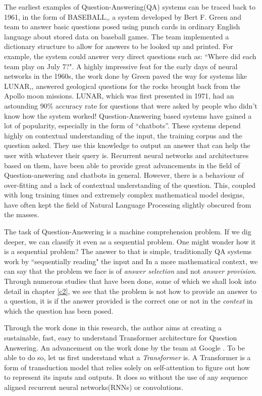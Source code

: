 \documentclass[a4paper,12pt]{report}
\begin{document}
    The earliest examples of Question-Answering(QA) systems can be traced back to 1961, in the form of BASEBALL,\citep{green1961baseball}, a system developed by Bert F. Green and team to answer basic questions posed using punch cards in ordinary English language about stored data on baseball games. The team implemented a dictionary structure to allow for answers to be looked up and printed. For example, the system could answer very direct questions such as: ``Where did each team play on July 7?".
    A highly impressive feat for the early days of neural networks in the 1960s, the work done by Green paved the way for systems like LUNAR,\citep{lunar}, answered geological questions for the rocks brought back from the Apollo moon missions. LUNAR, which was first presented in 1971, had an astounding 90\% accuracy rate for questions that were asked by people who didn't know how the system worked!
    Question-Answering based systems have gained a lot of popularity, especially in the form of ``chatbots''. These systems depend highly on contextual understanding of the input, the training corpus and the question asked. They use this knowledge to output an answer that can help the user with whatever their query is. Recurrent neural networks and architectures based on them, have been able to provide great advancements in the field of Question-answering and chatbots in general. However, there is a behaviour of over-fitting and a lack of contextual understanding of the question. This, coupled with long training times and extremely complex mathematical model designs, have often kept the field of Natural Language Processing slightly obscured from the masses.


    The task of Question-Answering is a machine comprehension problem. If we dig deeper, we can classify it even as a sequential problem. One might wonder how it is a sequential problem? The answer to that is simple, traditionally QA systems work by ``sequentially reading" the input and 
    In a more mathematical context, we can say that the problem we face is of \textit{answer selection} and not \textit{answer provision}. Through numerous studies that have been done, some of which we shall look into detail in chapter \ref{c2}, we see that the problem is not how to provide an answer to a question, it is if the answer provided is the correct one or not in the \textit{context} in which the question has been posed.

    Through the work done in this research, the author aims at creating a sustainable, fast, easy to understand Transformer architecture for Question Answering. An advancement on the work done by the team at Google \citep{atayl}. To be able to do so, let us first understand what a \textit{Transformer} is.
    A Transformer is a form of transduction model that relies solely on self-attention to figure out how to represent its inputs and outputs. It does so without the use of any sequence aligned recurrent neural networks(RNNs) or convolutions.
\end{document}
